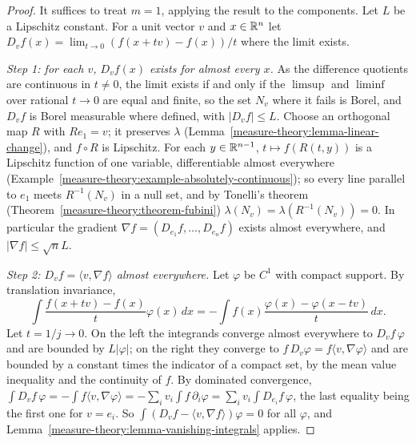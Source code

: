 \begin{proof}
It suffices to treat $m = 1$, applying the result to the components. Let $L$ be a Lipschitz constant. For a unit vector $v$ and $x \in \mathbb{R}^n$ let
$D_vf(x) = \lim_{t \to 0}(f(x + tv) - f(x))/t$ where the limit exists.

\emph{Step 1: for each $v$, $D_vf(x)$ exists for almost every $x$.} As the difference quotients are continuous in $t \neq 0$, the limit exists if and only if the $\limsup$ and $\liminf$ over
rational $t \to 0$ are equal and finite, so the set $N_v$ where it fails is Borel, and $D_vf$ is Borel measurable where defined, with $|D_vf| \leq L$. Choose an orthogonal map $R$ with $Re_1 = v$;
it preserves $\lambda$ (Lemma~\ref{measure-theory:lemma-linear-change}), and $f \circ R$ is Lipschitz. For each $y \in \mathbb{R}^{n-1}$, $t \mapsto f(R(t, y))$ is a Lipschitz function of one variable,
differentiable almost everywhere (Example~\ref{measure-theory:example-absolutely-continuous}); so every line parallel to $e_1$ meets $R^{-1}(N_v)$ in a null set, and by Tonelli's theorem
(Theorem~\ref{measure-theory:theorem-fubini}) $\lambda(N_v) = \lambda(R^{-1}(N_v)) = 0$. In particular the gradient $\nabla f = (D_{e_1}f, \ldots, D_{e_n}f)$ exists almost everywhere, and
$|\nabla f| \leq \sqrt nL$.

\emph{Step 2: $D_vf = \langle v, \nabla f\rangle$ almost everywhere.} Let $\varphi$ be $C^1$ with compact support. By translation invariance,
\[
\int\frac{f(x + tv) - f(x)}{t}\varphi(x)\,dx = -\int f(x)\frac{\varphi(x) - \varphi(x - tv)}{t}\,dx .
\]
Let $t = 1/j \to 0$. On the left the integrands converge almost everywhere to $D_vf\,\varphi$ and are bounded by $L|\varphi|$; on the right they converge to $f\,D_v\varphi = f\langle v, \nabla\varphi\rangle$
and are bounded by a constant times the indicator of a compact set, by the mean value inequality and the continuity of $f$. By dominated convergence,
$\int D_vf\,\varphi = -\int f\langle v, \nabla\varphi\rangle = -\sum_iv_i\int f\,\partial_i\varphi = \sum_iv_i\int D_{e_i}f\,\varphi$, the last equality being the first one for $v = e_i$. So
$\int(D_vf - \langle v, \nabla f\rangle)\varphi = 0$ for all $\varphi$, and Lemma~\ref{measure-theory:lemma-vanishing-integrals} applies.


\end{proof}
